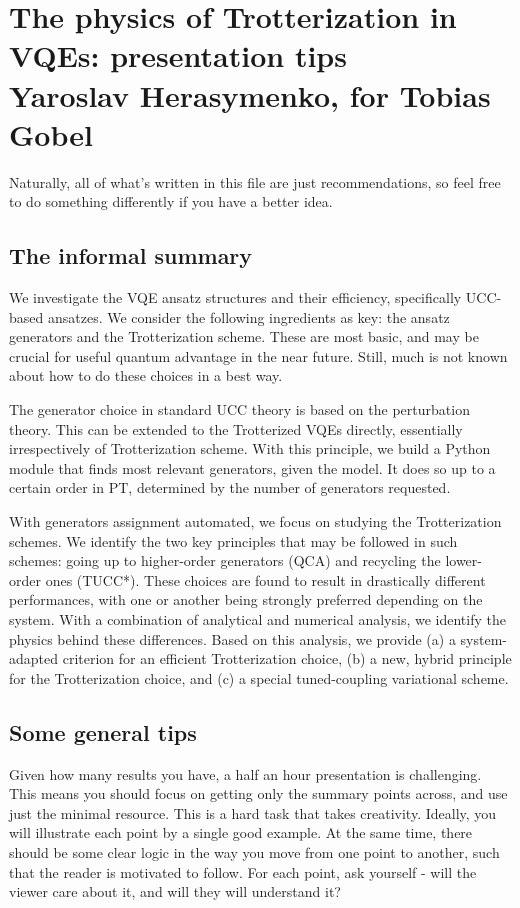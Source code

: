 \documentclass[10pt, a4paper]{article}
\begin{document}
\section*{The physics of Trotterization in VQEs: presentation tips\\
\small{Yaroslav Herasymenko, for Tobias Gobel}}


Naturally, all of what's written in this file are just recommendations, so feel free to do something differently if you have a better idea.

\subsection*{The informal summary}

We investigate the VQE ansatz structures and their efficiency, specifically UCC-based ansatzes. We consider the following ingredients as key: the ansatz generators and the Trotterization scheme. These are most basic, and may be crucial for useful quantum advantage in the near future. Still, much is not known about how to do these choices in a best way.

The generator choice in standard UCC theory is based on the perturbation theory. This can be extended to the Trotterized VQEs directly, essentially irrespectively of Trotterization scheme. With this principle, we build a Python module that finds most relevant generators, given the model. It does so up to a certain order in PT, determined by the number of generators requested.

With generators assignment automated, we focus on studying the Trotterization schemes. We identify the two key principles that may be followed in such schemes: going up to higher-order generators (QCA) and recycling the lower-order ones (TUCC*). These choices are found to result in drastically different performances, with one or another being strongly preferred depending on the system. With a combination of analytical and numerical analysis, we identify the physics behind these differences. Based on this analysis, we provide (a) a system-adapted criterion for an efficient Trotterization choice, (b) a new, hybrid principle for the Trotterization choice, and (c) a special tuned-coupling variational scheme.

\subsection*{Some general tips}

Given how many results you have, a half an hour presentation is challenging. This means you should focus on getting only the summary points across, and use just the minimal resource. This is a hard task that takes creativity. Ideally, you will illustrate each point by a single good example. At the same time, there should be some clear logic in the way you move from one point to another, such that the reader is motivated to follow. For each point, ask yourself - will the viewer care about it, and will they will understand it?
\end{document}
